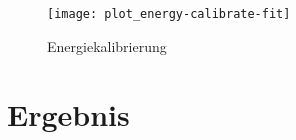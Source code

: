 \documentclass[11pt, ngerman, fleqn, DIV=15, headinclude, BCOR=2cm]{scrreprt}
\newcommand{\plotwidth}{0.8\linewidth}
\begin{document}
\begin{figure}
    \centering
    \texttt{[image: plot\_energy-calibrate-fit]}
    \caption{%
	    Energiekalibrierung
    }
    \label{fig:plot_energy-calibrate-fit}
\end{figure}



\chapter{Ergebnis}



\end{document}
